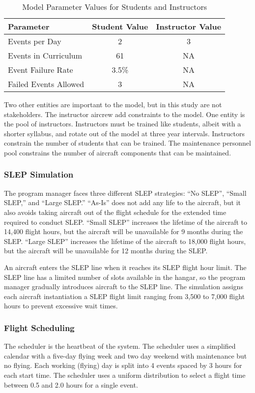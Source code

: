 \documentclass[preprint,12pt]{elsarticle}
\begin{document}
\begin{table}[h]
  \centering
  \begin{tabular}{l c c}
    \hline
    \hline
    \textbf{Parameter} & \textbf{Student Value} & \textbf{Instructor Value} \\
    \hline
    Events per Day & 2 & 3 \\
    Events in Curriculum & 61 & NA \\
    Event Failure Rate & 3.5\% & NA \\
    Failed Events Allowed & 3 & NA \\
    \hline
  \end{tabular}
  \caption{Model Parameter Values for Students and Instructors}
  \label{t:aircrewParams}
\end{table}

Two other entities are important to the model, but in this study are
not stakeholders. The instructor aircrew  add
constraints to the model. One entity is the pool of
instructors. Instructors must be trained like students, albeit with a
shorter syllabus, and rotate out of the model at three year
intervals. Instructors constrain the number of students that can be
trained. The maintenance personnel pool constrains the number of
aircraft components that can be maintained.

\subsubsection{SLEP Simulation}

The program manager faces three different SLEP strategies: ``No
SLEP'', ``Small SLEP,'' and ``Large SLEP.'' ``As-Is'' does not add any
life to the aircraft, but it also avoids 
taking aircraft out of the flight schedule for the extended time
required to conduct SLEP. ``Small SLEP'' increases the 
lifetime of the aircraft to 14,400 flight hours, 
but the aircraft will be unavailable for 9 months during the
SLEP. ``Large SLEP'' increases the lifetime of the
aircraft to 18,000 flight hours, but the aircraft will be unavailable for
12 months during the SLEP.

An aircraft enters the SLEP line when it reaches its SLEP flight hour
limit. The SLEP line has a limited number of slots available in the
hangar, so the program manager gradually introduces aircraft to the
SLEP line. The simulation assigns each aircraft instantiation a SLEP
flight limit ranging from 3,500  to 7,000 flight hours to prevent
excessive wait times.  

\subsubsection{Flight Scheduling}
The scheduler is the heartbeat of the system. The scheduler uses a
simplified calendar with a five-day flying week and two day weekend
with maintenance but no flying. Each working (flying) day is split into 4
events spaced by 3 hours for each start time. The scheduler uses a
uniform distribution to select a flight time between 0.5 and 2.0 hours
for a single event.
\end{document}
